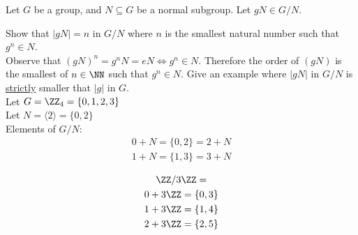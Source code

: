 \documentclass[class=scrartcl, crop=false]{standalone}
\begin{document}
\begin{exercise*}
  Let $G$ be a group, and $N \subseteq G$ be a normal subgroup. Let $gN \in G / N$.
  \begin{enumerate}[label=(\alph*)]
    \ii
    Show that $|gN| = n$ in $G / N$ where  $n$ is the smallest natural number such that  $g^n \in N$.
    \\
    Observe that $(gN)^n = g^nN = eN \Leftrightarrow g^n \in N$. Therefore the order of $(gN)$ is the smallest of $n \in \NN$ such that $g^n \in N$.
    \ii
    Give an example where $|gN|$ in $G / N$ is \ul{strictly} smaller that $|g|$ in $G$.
    \\
    Let $G = \ZZ_4 = \{0, 1, 2, 3\}$ \\
    Let $N = \langle 2 \rangle = \{0, 2\}$ \\
    Elements of $G / N$:
    \begin{gather*}
      0 + N = \{0, 2\} = 2 + N \\
      1 + N = \{1, 3\} = 3 + N
    \end{gather*}
  \end{enumerate}
\end{exercise*}

\begin{gather*}
  \ZZ / 3 \ZZ = \\
  0 + 3 \ZZ = \{0, 3\} \\
  1 + 3 \ZZ = \{1, 4\} \\
  2 + 3 \ZZ = \{2, 5\}
\end{gather*}
\end{document}

